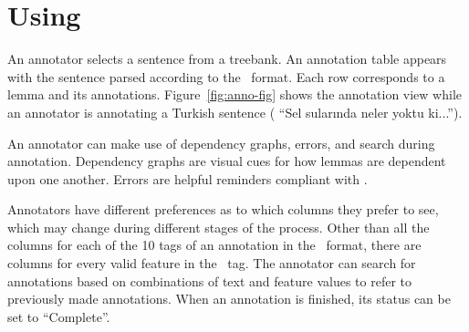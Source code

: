 \section{Using \boatvtwo}
\label{sec:annotation}

An annotator selects a sentence from a treebank.
An annotation table appears with the sentence parsed according to the \ud\ format.
Each row corresponds to a lemma and its annotations.
Figure~\ref{fig:anno-fig} shows the annotation view while an annotator is annotating a Turkish sentence ( ``Sel sularında neler yoktu ki...'').

An annotator can make use of dependency graphs, errors, and search during annotation.
Dependency graphs are visual cues for how lemmas are dependent upon one another.
Errors are helpful reminders compliant with \ud.

Annotators have different preferences as to which columns they prefer to see, which may change during different stages of the process.
Other than all the columns for each of the 10 tags of an annotation in the \conllu\ format, there are columns for every valid feature in the \feats\ tag.
The annotator can search for annotations based on combinations of text and feature values to refer to previously made annotations.
When an annotation is finished, its status can be set to ``Complete''.
